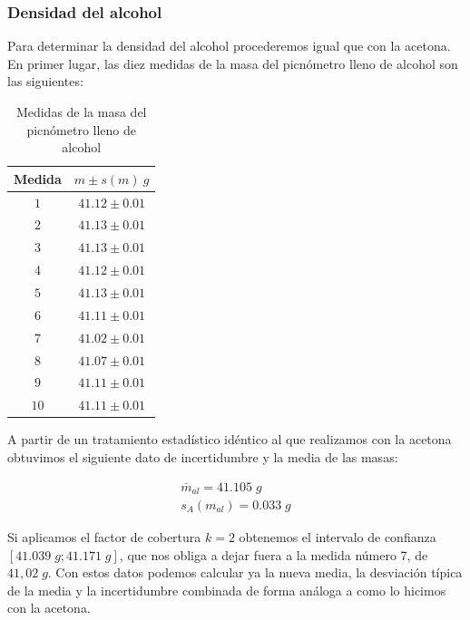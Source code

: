 \documentclass[a4paper,12pt,titlepage]{report}
\begin{document}
\newpage

\subsubsection{Densidad del alcohol}

Para determinar la densidad del alcohol procederemos igual que con la acetona. En primer lugar, las diez medidas de la masa del picnómetro lleno de alcohol son las siguientes:

\begin{table}[h!]
    \centering
    \begin{tabular}{|c|c|}
    \hline
    Medida & $m \pm s(m) \: g$   \\ \hline
    $1$    & $41.12\pm0.01$ \\ \hline
    $2$    & $41.13\pm0.01$ \\ \hline
    $3$    & $41.13\pm0.01$ \\ \hline
    $4$    & $41.12\pm0.01$ \\ \hline
    $5$    & $41.13\pm0.01$ \\ \hline
    $6$    & $41.11\pm0.01$ \\ \hline
    $7$    & $41.02\pm0.01$ \\ \hline
    $8$    & $41.07\pm0.01$ \\ \hline
    $9$    & $41.11\pm0.01$ \\ \hline
    $10$   & $41.11\pm0.01$ \\ \hline
    \end{tabular}
    \caption{Medidas de la masa del picnómetro lleno de alcohol}
    \label{Masas Alcohol}
    \end{table}

A partir de un tratamiento estadístico idéntico al que realizamos con la acetona obtuvimos el siguiente dato de incertidumbre y la media de las masas:

\begin{gather}
    \overline{m}_{al} = 41.105 \; g \\
    s_{A}(m_{al}) =  0.033 \; g 
\end{gather}

Si aplicamos el factor de cobertura $k=2$ obtenemos el intervalo de confianza $[41.039 \; g ; 41.171 \; g]$, que nos obliga a dejar fuera a la medida número 7, de $41,02 \;g$. Con estos datos podemos calcular ya la nueva media, la desviación típica de la media y la incertidumbre combinada de forma análoga a como lo hicimos con la acetona.
\end{document}
